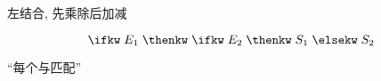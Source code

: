 \begin{frame}{}
  

  \vspace{0.30cm}
  \begin{center}
    左结合, 先乘除后加减
  \end{center}

  \pause
  
\end{frame}

\begin{frame}{}
  \begin{center}

    \[
      \ifkw\; E_{1} \;\thenkw\; \ifkw\; E_{2} \;\thenkw\; S_{1} \;\elsekw\; S_{2} 
    \]


    ``每个\elsekw{}与\thenkw{}匹配''
  \end{center}
\end{frame}

\begin{frame}{}
  \begin{center}
  \end{center}
\end{frame}

\begin{frame}{}
\end{frame}

\begin{frame}{}
\end{frame}

\begin{frame}{}
\end{frame}
